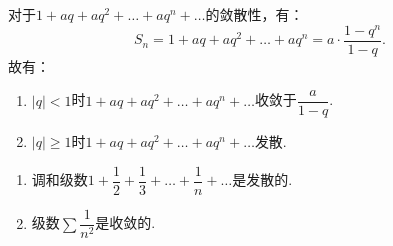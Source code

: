 \begin{proposition}[几何级数]
	对于$1+aq+aq^2+\dots+aq^n+\dots$的敛散性，有：
	\begin{equation}
		S_n = 1+aq+aq^2+\dots+aq^n = a \cdot \dfrac{1-q^n}{1-q}.
	\end{equation}
	故有：
	\begin{enumerate}
		\item $|q|<1$时$1+aq+aq^2+\dots+aq^n+\dots$收敛于$\dfrac{a}{1-q}$.
		\item $|q|\geq 1$时$1+aq+aq^2+\dots+aq^n+\dots$发散.
	\end{enumerate}
\end{proposition}


\begin{proposition}[典型级数]
	\begin{enumerate}
		\item 调和级数$1+\dfrac{1}{2}+\dfrac{1}{3}+\dots+\dfrac{1}{n}+\dots$是发散的.
		\item 级数$\sum\dfrac{1}{n^2}$是收敛的.
	\end{enumerate}
\end{proposition}

































